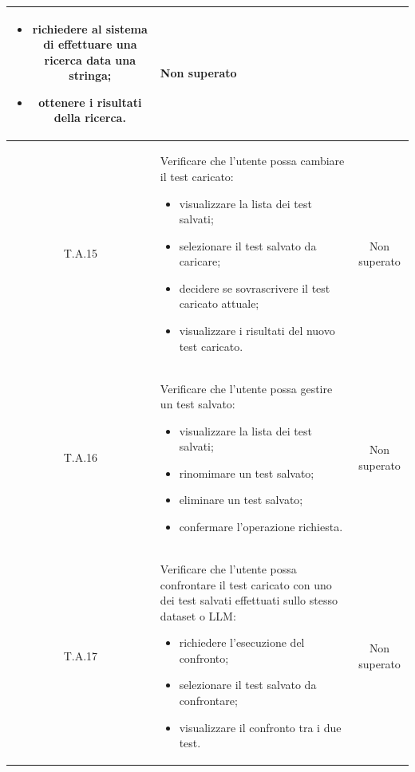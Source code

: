 \begin{tabularx}{\textwidth}{|c|X|c|}
\begin{itemize}
                            \item richiedere al sistema di effettuare una ricerca data una stringa;
                            \item ottenere i risultati della ricerca.
                        \end{itemize} & Non superato\\ %
    \hline
    \label{ta:ta15}T.A.15 & Verificare che l'utente possa cambiare il test caricato:
                        \begin{itemize}
                            \item visualizzare la lista dei test salvati;
                            \item selezionare il test salvato da caricare;
                            \item decidere se sovrascrivere il test caricato attuale;
                            \item visualizzare i risultati del nuovo test caricato.
                        \end{itemize} & Non superato\\ %
    \hline
    \label{ta:ta16}T.A.16 & Verificare che l'utente possa gestire un test salvato:
                        \begin{itemize}
                            \item visualizzare la lista dei test salvati;
                            \item rinomimare un test salvato;
                            \item eliminare un test salvato;
                            \item confermare l'operazione richiesta.
                        \end{itemize} & Non superato\\%
    \hline
    \label{ta:ta17}T.A.17 & Verificare che l'utente possa confrontare il test caricato con uno dei test salvati effettuati sullo stesso dataset o LLM:
                        \begin{itemize}
                            \item richiedere l'esecuzione del confronto;
                            \item selezionare il test salvato da confrontare;
                            \item visualizzare il confronto tra i due test.
                        \end{itemize} & Non superato\\ %

\end{tabularx}
